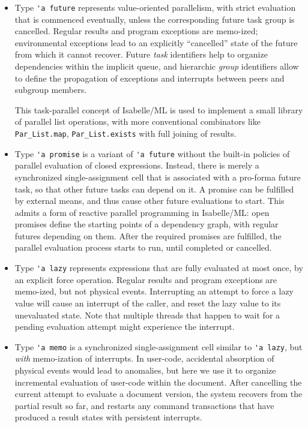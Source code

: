 \begin{isabellebody}
\begin{isamarkuptext}
\begin{itemize}
\begin{itemize}
  \item Type \verb|'a future| represents value-oriented
  parallelism, with strict evaluation that is commenced eventually,
  unless the corresponding future task group is cancelled.  Regular
  results and program exceptions are memo-ized; environmental
  exceptions lead to an explicitly ``cancelled'' state of the future
  from which it cannot recover.  Future \emph{task} identifiers help
  to organize dependencies within the implicit queue, and hierarchic
  \emph{group} identifiers allow to define the propagation of
  exceptions and interrupts between peers and subgroup members.

  This task-parallel concept of Isabelle/ML is used to implement a
  small library of parallel list operations, with more conventional
  combinators like \verb|Par_List.map|, \verb|Par_List.exists| with full joining of results.

  \item Type \verb|'a promise|
  is a variant of \verb|'a future| without the built-in
  policies of parallel evaluation of closed expressions.  Instead,
  there is merely a synchronized single-assignment cell that is
  associated with a pro-forma future task, so that other future tasks
  can depend on it.  A promise can be fulfilled by external means, and
  thus cause other future evaluations to start.  This admits a
  form of reactive parallel programming in Isabelle/ML: open promises
  define the starting points of a dependency graph, with regular
  futures depending on them.  After the required promises are
  fulfilled, the parallel evaluation process starts to run, until
  completed or cancelled.

  \item Type \verb|'a lazy| represents expressions that are
  fully evaluated at most once, by an explicit force operation.
  Regular results and program exceptions are memo-ized, but not
  physical events.  Interrupting an attempt to force a lazy value will
  cause an interrupt of the caller, and reset the lazy value to its
  unevaluated state.  Note that multiple threads that happen to wait
  for a pending evaluation attempt might experience the interrupt.

  \item Type \verb|'a memo| is a synchronized single-assignment
  cell similar to \verb|'a lazy|, but \emph{with} memo-ization
  of interrupts.  In user-code, accidental absorption of physical
  events would lead to anomalies, but here we use it to organize
  incremental evaluation of user-code within the document.  After
  cancelling the current attempt to evaluate a document version, the
  system recovers from the partial result so far, and restarts any
  command transactions that have produced a result states with
  persistent interrupts.


\end{itemize}
\end{itemize}
\end{isamarkuptext}
\end{isabellebody}
